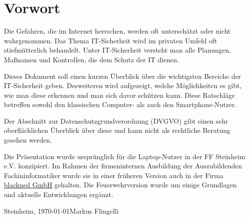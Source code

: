 \section*{Vorwort}
Die Gefahren, die im Internet herrschen, werden oft unterschätzt oder nicht wahrgenommen. Das Thema IT-Sicherheit wird im privaten Umfeld oft stiefmütterlich behandelt. Unter IT-Sicher\-heit versteht man alle Planungen, Maßnamen und Kontrollen, die dem Schutz der IT dienen.
\vspace{12pt}

Dieses Dokument soll einen kurzen Überblick über die wichtigsten Bereiche der IT-Sicherheit geben.  Desweiteren wird aufgezeigt, welche Möglichkeiten es gibt, wie man diese erkennen und man sich davor schützen kann. Diese Ratschläge betreffen sowohl den klassischen Com\-puter- als auch den Smartphone-Nutzer.
\vspace{12pt}

Der Abschnitt zur Datenschutzgrundverordnung (DVGVO) gibt einen sehr oberflächlichen Überblick über diese und kann nicht als rechtliche Beratung gesehen werden.
\vspace{12pt}

Die Präsentation wurde ursprünglich für die Laptop-Nutzer in der FF Steinheim e.V. konzipiert. Im Rahmen der firmeninternen Ausbildung der Auszubildenden Fachininformatiker wurde sie in einer früheren Version auch in der Firma \href{https://www.blackned.de}{blackned GmbH} gehalten. Die Feuerwehrversion wurde um einige Grundlagen und aktuelle Entwicklungen ergänzt.
\vspace{24pt}

Steinheim, \today \hfill Markus Flingelli
\newpage